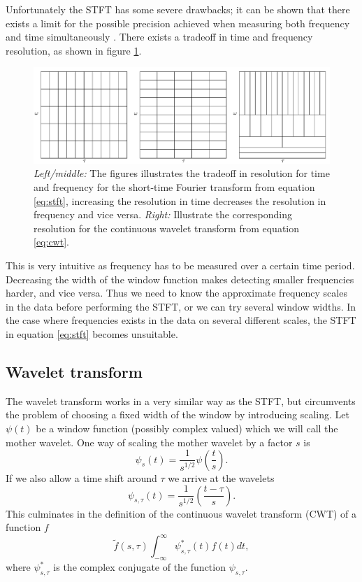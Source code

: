 \documentclass[a4paper, 10pt]{memoir}
\theoremstyle{plain}
\theoremstyle{definition}
\theoremstyle{remark}
\begin{document}
Unfortunately the STFT has some severe drawbacks; it can be shown that there exists a limit for the possible precision achieved when measuring both frequency and time simultaneously \cite{kaiser}.
There exists a tradeoff in time and frequency resolution, as shown in figure \ref{fig:grid}.
\begin{figure}[tb]
        \centering
        \includegraphics[width=\linewidth]{./figures/stft_cwt_grid/stft_cwt_grid.pdf}
        \caption{
        \textit{Left/middle:} The figures illustrates the tradeoff in resolution for time and frequency for the short-time Fourier transform from equation \eqref{eq:stft}, increasing the resolution in time decreases the resolution in frequency and vice versa.
\textit{Right:} Illustrate the corresponding resolution for the continuous wavelet transform from equation \eqref{eq:cwt}.
}
        \label{fig:grid}
\end{figure}
This is very intuitive as frequency has to be measured over a certain time period.
Decreasing the width of the window function makes detecting smaller frequencies harder, and vice versa.
Thus we need to know the approximate frequency scales in the data before performing the STFT, or we can try several window widths.
In the case where frequencies exists in the data on several different scales, the STFT in equation \eqref{eq:stft} becomes unsuitable.



\subsection{Wavelet transform}
The wavelet transform works in a very similar way as the STFT, but circumvents the problem of choosing a fixed width of the window by introducing scaling.
Let $\psi(t)$ be a window function (possibly complex valued) which we will call the mother wavelet.
One way of scaling the mother wavelet by a factor $s$ is
\begin{equation*}
        \psi_s(t) = \frac{1}{s^{1/2}} \psi \left(\frac{t}{s}\right).
\end{equation*}
If we also allow a time shift around $\tau$ we arrive at the wavelets
\begin{equation*}
        \psi_{s,\tau}(t) = \frac{1}{s^{1/2}} \left( \frac{t - \tau}{s} \right).
\end{equation*}
This culminates in the definition of the continuous wavelet transform (CWT) of a function $f$ \cite{kaiser}
\begin{equation}\label{eq:cwt}
        \tilde{f}(s, \tau)\int_{-\infty}^{\infty}\psi_{s,\tau}^*(t)f(t) dt,
\end{equation}
where $\psi_{s,\tau}^*$ is the complex conjugate of the function $\psi_{s, \tau}$.
\end{document}
